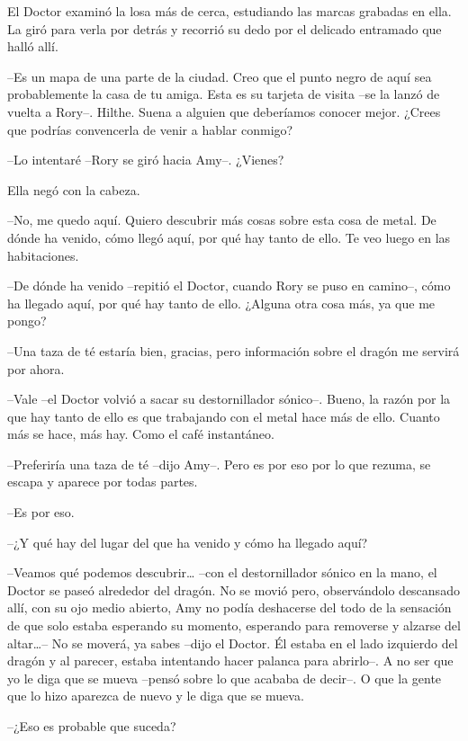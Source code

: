 {El Doctor examinó la losa más de cerca, estudiando las marcas grabadas
	en ella. La giró para verla por detrás y recorrió su dedo por el
delicado entramado que halló allí.}

{--Es un mapa de una parte de la ciudad. Creo que el punto negro de
	aquí sea probablemente la casa de tu amiga. Esta es su tarjeta de visita
	--se la lanzó de vuelta a Rory--. Hilthe. Suena a alguien que deberíamos
	conocer mejor. ¿Crees que podrías convencerla de venir a hablar
conmigo?}

{--Lo intentaré --Rory se giró hacia Amy--. ¿Vienes?}

{Ella negó con la cabeza.}

{--No, me quedo aquí. Quiero descubrir más cosas sobre esta cosa de
	metal. De dónde ha venido, cómo llegó aquí, por qué hay tanto de ello.
Te veo luego en las habitaciones.}

{--De dónde ha venido --repitió el Doctor, cuando Rory se puso en
	camino--, cómo ha llegado aquí, por qué hay tanto de ello. ¿Alguna otra
cosa más, ya que me pongo?}

{--Una taza de té estaría bien, gracias, pero información sobre el
dragón me servirá por ahora.}

{--Vale --el Doctor volvió a sacar su destornillador sónico--. Bueno,
	la razón por la que hay tanto de ello es que trabajando con el metal
	hace más de ello. Cuanto más se hace, más hay. Como el café
instantáneo.}

{--Preferiría una taza de té --dijo Amy--. Pero es por eso por lo que
rezuma, se escapa y aparece por todas partes.}

{--Es por eso.}

{--¿Y qué hay del lugar del que ha venido y cómo ha llegado aquí?}

{--Veamos qué podemos descubrir\ldots{} --con el destornillador sónico
	en la mano, el Doctor se paseó alrededor del dragón. No se movió pero,
	observándolo descansado allí, con su ojo medio abierto, Amy no podía
	deshacerse del todo de la sensación de que solo estaba esperando su
	momento, esperando para removerse y alzarse del altar\ldots{}-- No se
	moverá, ya sabes --dijo el Doctor. Él estaba en el lado izquierdo del
	dragón y al parecer, estaba intentando hacer palanca para abrirlo--. A
	no ser que yo le diga que se mueva --pensó sobre lo que acababa de
	decir--. O que la gente que lo hizo aparezca de nuevo y le diga que se
mueva.}

{--¿Eso es probable que suceda?}

